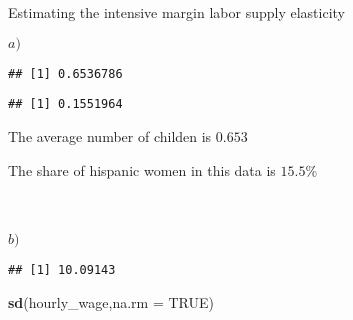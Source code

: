 \documentclass[
  ignorenonframetext,
]{beamer}
\newenvironment{Shaded}{\begin{snugshade}}{\end{snugshade}}
\newcommand{\DataTypeTok}[1]{\textcolor[rgb]{0.13,0.29,0.53}{#1}}
\newcommand{\DecValTok}[1]{\textcolor[rgb]{0.00,0.00,0.81}{#1}}
\newcommand{\KeywordTok}[1]{\textcolor[rgb]{0.13,0.29,0.53}{\textbf{#1}}}
\newcommand{\NormalTok}[1]{#1}
\newcommand{\OperatorTok}[1]{\textcolor[rgb]{0.81,0.36,0.00}{\textbf{#1}}}
\newcommand{\OtherTok}[1]{\textcolor[rgb]{0.56,0.35,0.01}{#1}}
\newcommand{\StringTok}[1]{\textcolor[rgb]{0.31,0.60,0.02}{#1}}
\begin{document}
\begin{frame}[fragile]{Estimating the intensive margin labor supply
elasticity}
\begin{block}{\(a)\)}
\begin{Shaded}
\end{Shaded}

\begin{verbatim}
## [1] 0.6536786
\end{verbatim}

\begin{Shaded}
\end{Shaded}

\begin{verbatim}
## [1] 0.1551964
\end{verbatim}

The average number of childen is \(0.653\)

The share of hispanic women in this data is \(15.5\)\%\\
~\\
~\\
\end{block}

\begin{block}{\(b)\)}
\protect\hypertarget{b}{}
\begin{Shaded}
\end{Shaded}

\begin{verbatim}
## [1] 10.09143
\end{verbatim}

\begin{Shaded}
\begin{Highlighting}[]
\KeywordTok{sd}\NormalTok{(hourly\_wage,}\DataTypeTok{na.rm =} \OtherTok{TRUE}\NormalTok{)}
\end{Highlighting}
\end{Shaded}


\end{block}
\end{frame}
\end{document}
